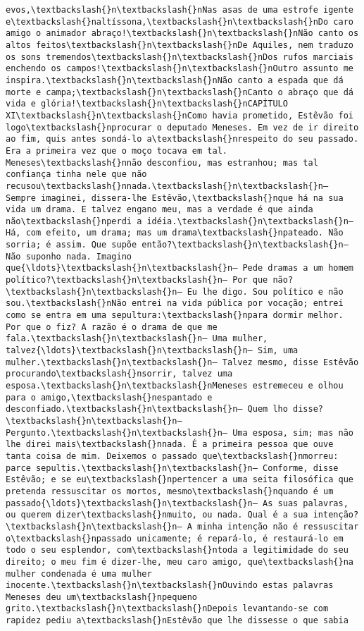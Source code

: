 \documentclass[11pt]{article}
\begin{document}
\begin{Verbatim}[commandchars=\\\{\}]
evos,\textbackslash{}n\textbackslash{}nNas asas de uma estrofe igente e\textbackslash{}naltíssona,\textbackslash{}n\textbackslash{}nDo caro amigo o animador abraço!\textbackslash{}n\textbackslash{}nNão canto os altos feitos\textbackslash{}n\textbackslash{}nDe Aquiles, nem traduzo os sons tremendos\textbackslash{}n\textbackslash{}nDos rufos marciais enchendo os campos!\textbackslash{}n\textbackslash{}nOutro assunto me inspira.\textbackslash{}n\textbackslash{}nNão canto a espada que dá morte e campa;\textbackslash{}n\textbackslash{}nCanto o abraço que dá vida e glória!\textbackslash{}n\textbackslash{}nCAPÍTULO XI\textbackslash{}n\textbackslash{}nComo havia prometido, Estêvão foi logo\textbackslash{}nprocurar o deputado Meneses. Em vez de ir direito ao fim, quis antes sondá-lo a\textbackslash{}nrespeito do seu passado. Era a primeira vez que o moço tocava em tal. Meneses\textbackslash{}nnão desconfiou, mas estranhou; mas tal confiança tinha nele que não recusou\textbackslash{}nnada.\textbackslash{}n\textbackslash{}n— Sempre imaginei, dissera-lhe Estêvão,\textbackslash{}nque há na sua vida um drama. E talvez engano meu, mas a verdade é que ainda não\textbackslash{}nperdi a idéia.\textbackslash{}n\textbackslash{}n— Há, com efeito, um drama; mas um drama\textbackslash{}npateado. Não sorria; é assim. Que supõe então?\textbackslash{}n\textbackslash{}n— Não suponho nada. Imagino que{\ldots}\textbackslash{}n\textbackslash{}n— Pede dramas a um homem político?\textbackslash{}n\textbackslash{}n— Por que não?\textbackslash{}n\textbackslash{}n— Eu lhe digo. Sou político e não sou.\textbackslash{}nNão entrei na vida pública por vocação; entrei como se entra em uma sepultura:\textbackslash{}npara dormir melhor. Por que o fiz? A razão é o drama de que me fala.\textbackslash{}n\textbackslash{}n— Uma mulher, talvez{\ldots}\textbackslash{}n\textbackslash{}n— Sim, uma mulher.\textbackslash{}n\textbackslash{}n— Talvez mesmo, disse Estêvão procurando\textbackslash{}nsorrir, talvez uma esposa.\textbackslash{}n\textbackslash{}nMeneses estremeceu e olhou para o amigo,\textbackslash{}nespantado e desconfiado.\textbackslash{}n\textbackslash{}n— Quem lho disse?\textbackslash{}n\textbackslash{}n— Pergunto.\textbackslash{}n\textbackslash{}n— Uma esposa, sim; mas não lhe direi mais\textbackslash{}nnada. É a primeira pessoa que ouve tanta coisa de mim. Deixemos o passado que\textbackslash{}nmorreu: parce sepultis.\textbackslash{}n\textbackslash{}n— Conforme, disse Estêvão; e se eu\textbackslash{}npertencer a uma seita filosófica que pretenda ressuscitar os mortos, mesmo\textbackslash{}nquando é um passado{\ldots}\textbackslash{}n\textbackslash{}n— As suas palavras, ou querem dizer\textbackslash{}nmuito, ou nada. Qual é a sua intenção?\textbackslash{}n\textbackslash{}n— A minha intenção não é ressuscitar o\textbackslash{}npassado unicamente; é repará-lo, é restaurá-lo em todo o seu esplendor, com\textbackslash{}ntoda a legitimidade do seu direito; o meu fim é dizer-lhe, meu caro amigo, que\textbackslash{}na mulher condenada é uma mulher inocente.\textbackslash{}n\textbackslash{}nOuvindo estas palavras Meneses deu um\textbackslash{}npequeno grito.\textbackslash{}n\textbackslash{}nDepois levantando-se com rapidez pediu a\textbackslash{}nEstêvão que lhe dissesse o que sabia 
\end{Verbatim}
\end{document}
